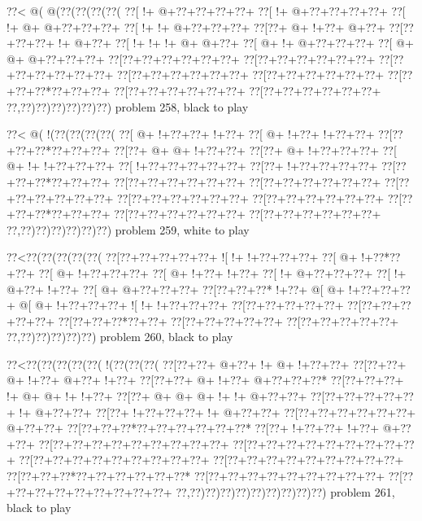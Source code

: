 \vbox{\vbox{\goo
\0??<\- @(\- @(\0??(\0??(\0??(\0??(
\0??[\- !+\- @+\0??+\0??+\0??+\0??+
\0??[\- !+\- @+\0??+\0??+\0??+\0??+
\0??[\- !+\- @+\- @+\0??+\0??+\0??+
\0??[\- !+\- !+\- @+\0??+\0??+\0??+
\0??[\0??+\- @+\- !+\0??+\- @+\0??+
\0??[\0??+\0??+\0??+\- !+\- @+\0??+
\0??[\- !+\- !+\- !+\- @+\- @+\0??+
\0??[\- @+\- !+\- @+\0??+\0??+\0??+
\0??[\- @+\- @+\- @+\0??+\0??+\0??+
\0??[\0??+\0??+\0??+\0??+\0??+\0??+
\0??[\0??+\0??+\0??+\0??+\0??+\0??+
\0??[\0??+\0??+\0??+\0??+\0??+\0??+
\0??[\0??+\0??+\0??+\0??+\0??+\0??+
\0??[\0??+\0??+\0??+\0??+\0??+\0??+
\0??[\0??+\0??+\0??*\0??+\0??+\0??+
\0??[\0??+\0??+\0??+\0??+\0??+\0??+
\0??[\0??+\0??+\0??+\0??+\0??+\0??+
\0??,\0??)\0??)\0??)\0??)\0??)\0??)
}
\hfil problem 258, black to play\hfil\break
}

\vbox{\vbox{\goo
\0??<\- @(\- !(\0??(\0??(\0??(\0??(
\0??[\- @+\- !+\0??+\0??+\- !+\0??+
\0??[\- @+\- !+\0??+\- !+\0??+\0??+
\0??[\0??+\0??+\0??*\0??+\0??+\0??+
\0??[\0??+\- @+\- @+\- !+\0??+\0??+
\0??[\0??+\- @+\- !+\0??+\0??+\0??+
\0??[\- @+\- !+\- !+\0??+\0??+\0??+
\0??[\- !+\0??+\0??+\0??+\0??+\0??+
\0??[\0??+\- !+\0??+\0??+\0??+\0??+
\0??[\0??+\0??+\0??*\0??+\0??+\0??+
\0??[\0??+\0??+\0??+\0??+\0??+\0??+
\0??[\0??+\0??+\0??+\0??+\0??+\0??+
\0??[\0??+\0??+\0??+\0??+\0??+\0??+
\0??[\0??+\0??+\0??+\0??+\0??+\0??+
\0??[\0??+\0??+\0??+\0??+\0??+\0??+
\0??[\0??+\0??+\0??*\0??+\0??+\0??+
\0??[\0??+\0??+\0??+\0??+\0??+\0??+
\0??[\0??+\0??+\0??+\0??+\0??+\0??+
\0??,\0??)\0??)\0??)\0??)\0??)\0??)
}
\hfil problem 259, white to play\hfil\break
}

\vbox{\vbox{\goo
\0??<\0??(\0??(\0??(\0??(\0??(
\0??[\0??+\0??+\0??+\0??+\0??+
\- ![\- !+\- !+\0??+\0??+\0??+
\0??[\- @+\- !+\0??*\0??+\0??+
\0??[\- @+\- !+\0??+\0??+\0??+
\0??[\- @+\- !+\0??+\- !+\0??+
\0??[\- !+\- @+\0??+\0??+\0??+
\0??[\- !+\- @+\0??+\- !+\0??+
\0??[\- @+\- @+\0??+\0??+\0??+
\0??[\0??+\0??+\0??*\- !+\0??+
\- @[\- @+\- !+\0??+\0??+\0??+
\- @[\- @+\- !+\0??+\0??+\0??+
\- ![\- !+\- !+\0??+\0??+\0??+
\0??[\0??+\0??+\0??+\0??+\0??+
\0??[\0??+\0??+\0??+\0??+\0??+
\0??[\0??+\0??+\0??*\0??+\0??+
\0??[\0??+\0??+\0??+\0??+\0??+
\0??[\0??+\0??+\0??+\0??+\0??+
\0??,\0??)\0??)\0??)\0??)\0??)
}
\hfil problem 260, black to play\hfil\break
}

\vbox{\vbox{\goo
\0??<\0??(\0??(\0??(\0??(\0??(\- !(\0??(\0??(\0??(
\0??[\0??+\0??+\- @+\0??+\- !+\- @+\- !+\0??+\0??+
\0??[\0??+\0??+\- @+\- !+\0??+\- @+\0??+\- !+\0??+
\0??[\0??+\0??+\- @+\- !+\0??+\- @+\0??+\0??+\0??*
\0??[\0??+\0??+\0??+\- !+\- @+\- @+\- !+\- !+\0??+
\0??[\0??+\- @+\- @+\- @+\- !+\- !+\- @+\0??+\0??+
\0??[\0??+\0??+\0??+\0??+\0??+\- !+\- @+\0??+\0??+
\0??[\0??+\- !+\0??+\0??+\0??+\- !+\- @+\0??+\0??+
\0??[\0??+\0??+\0??+\0??+\0??+\0??+\- @+\0??+\0??+
\0??[\0??+\0??+\0??*\0??+\0??+\0??+\0??+\0??+\0??*
\0??[\0??+\- !+\0??+\0??+\- !+\0??+\- @+\0??+\0??+
\0??[\0??+\0??+\0??+\0??+\0??+\0??+\0??+\0??+\0??+
\0??[\0??+\0??+\0??+\0??+\0??+\0??+\0??+\0??+\0??+
\0??[\0??+\0??+\0??+\0??+\0??+\0??+\0??+\0??+\0??+
\0??[\0??+\0??+\0??+\0??+\0??+\0??+\0??+\0??+\0??+
\0??[\0??+\0??+\0??*\0??+\0??+\0??+\0??+\0??+\0??*
\0??[\0??+\0??+\0??+\0??+\0??+\0??+\0??+\0??+\0??+
\0??[\0??+\0??+\0??+\0??+\0??+\0??+\0??+\0??+\0??+
\0??,\0??)\0??)\0??)\0??)\0??)\0??)\0??)\0??)\0??)
}
\hfil problem 261, black to play\hfil\break
}

